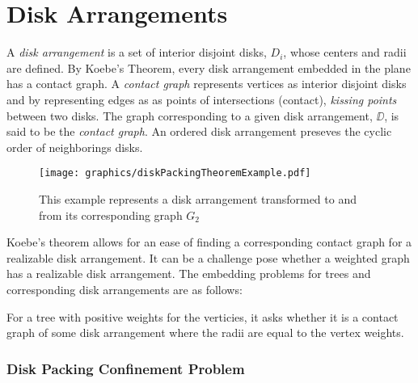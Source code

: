 \section{Disk Arrangements}

A \textit{disk arrangement} is a set of interior disjoint disks, $D_i$, whose centers and radii are defined.  
By Koebe's Theorem, every disk arrangement embedded in the plane has a contact graph.
A \textit{contact graph} represents vertices as interior disjoint disks and by representing edges as as points of intersections (contact), \textit{kissing points} between two disks.  
The graph corresponding to a given disk arrangement, $\DD$, is said to be the \textit{contact graph}. 
An ordered disk arrangement preseves the  cyclic order of neighborings disks. 
\begin{figure}[h]
\begin{center}
\texttt{[image: graphics/diskPackingTheoremExample.pdf]}
\end{center} 
\caption{This example represents a disk arrangement transformed to and from its corresponding graph 
$G_2$}
\label{fig:DiskArrangement-1}
\end{figure}

Koebe's theorem allows for an ease of finding a corresponding contact graph for a realizable disk arrangement.  
It can be a challenge pose whether a weighted graph has a realizable disk arrangement.
The embedding problems for trees and corresponding disk arrangements are as follows:
\begin{prob}\label{problem:UnorderedTree}
For a tree with positive weights for the verticies, it asks whether it is a contact graph of some 
disk arrangement where the radii are equal to the vertex weights.
\end{prob}

\subsubsection{Disk Packing Confinement Problem}

